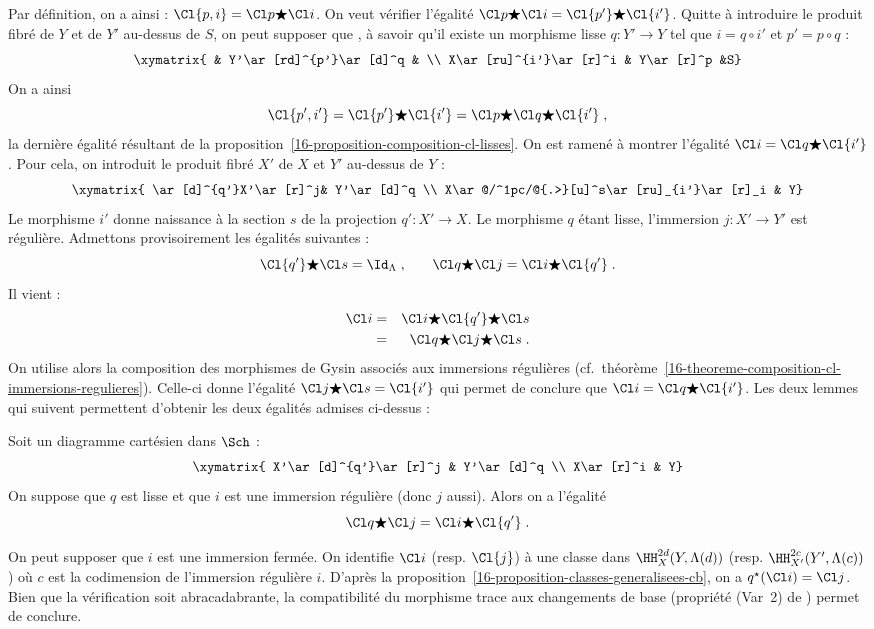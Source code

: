 \documentclass[10pt]{../fichiers-configuration-latex/smfart}
\begin{document}
Par définition, on a ainsi : $\Cl {p,i}=\Cl p\bigstar \Cl i$.
On veut vérifier l'égalité $\Cl p\bigstar\Cl i=\Cl {p'}\bigstar \Cl {i'}$.
Quitte à introduire le produit fibré de $Y$ et de $Y'$ au-dessus de $S$, on
peut supposer que , à savoir qu'il existe un
morphisme lisse $q\colon Y'\to Y$ tel que $i=q\circ i'$ et $p'=p\circ q$ :
\[
\xymatrix{
& Y'\ar[rd]^{p'}\ar[d]^q & \\
X\ar[ru]^{i'}\ar[r]^i & Y\ar[r]^p &S}
\]
On a ainsi
\[\Cl{p',i'}=\Cl {p'}\bigstar \Cl{i'}=\Cl p\bigstar\Cl q\bigstar \Cl{i'}\;
\text{,}\]
la dernière égalité résultant de la
proposition~\ref{16-proposition-composition-cl-lisses}. On est ramené à montrer
l'égalité $\Cl i=\Cl q\bigstar\Cl {i'}$. Pour cela, on introduit le produit
fibré $X'$ de $X$ et $Y'$ au-dessus de $Y$ :
\[
\xymatrix{
\ar[d]^{q'}X'\ar[r]^j& Y'\ar[d]^q \\
X\ar@/^1pc/@{.>}[u]^s\ar[ru]_{i'}\ar[r]_i & Y}
\]
Le morphisme $i'$ donne naissance à la section $s$ de la projection
$q'\colon X'\to X$. Le morphisme $q$ étant lisse, l'immersion $j\colon
X'\to Y'$ est régulière. Admettons provisoirement les
égalités suivantes :
\[\Cl {q'}\bigstar \Cl s=\Id_\Lambda\;\text{,}\qquad 
\Cl q\bigstar \Cl j=\Cl i\bigstar \Cl {q'}\;\text{.}\]
Il vient :
\begin{eqnarray*}
\Cl i&=&\Cl i\bigstar \Cl {q'}\bigstar \Cl s\\
&=& \Cl q\bigstar \Cl j\bigstar \Cl s\;\text{.}
\end{eqnarray*}
On utilise alors la composition des morphismes de Gysin associés aux
immersions régulières 
(cf.~théorème~\ref{16-theoreme-composition-cl-immersions-regulieres}).
Celle-ci donne l'égalité $\Cl j\bigstar \Cl s=\Cl {i'}$ qui permet de
conclure que $\Cl i=\Cl q\bigstar \Cl {i'}$. Les deux lemmes qui suivent
permettent d'obtenir les deux égalités admises ci-dessus :

\begin{lemme2}\label{16-lemme-cb-lisse}
Soit un diagramme cartésien dans $\Sch$ :
\[
\xymatrix{
X'\ar[d]^{q'}\ar[r]^j & Y'\ar[d]^q \\
X\ar[r]^i & Y}
\]
On suppose que $q$ est lisse et que $i$ est une immersion régulière (donc
$j$ aussi). Alors on a l'égalité
\[\Cl q\bigstar \Cl j=\Cl i\bigstar\Cl {q'}\;\text{.}\]
\end{lemme2}

On peut supposer que $i$ est une immersion fermée.
On identifie $\Cl i$ (resp. $\Cl {j}$) à une classe dans 
$\HH^{2d}_X(Y,\Lambda(d))$ (resp. $\HH^{2c}_{X'}(Y',\Lambda(c))$) où $c$ est
la codimension de l'immersion régulière $i$. D'après la
proposition~\ref{16-proposition-classes-generalisees-cb}, on a
$q^\star(\Cl i)=\Cl j$. Bien que la vérification soit abracadabrante, 
la compatibilité du morphisme trace aux changements
de base (propriété (Var~2) de ) permet de conclure.
\end{document}
